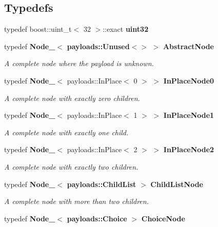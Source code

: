\subsection*{Typedefs}
\begin{CompactItemize}
\item 
typedef boost::uint\_\-t$<$ 32 $>$::exact {\bf uint32}\label{namespacesprite_a11}

\item 
typedef {\bf Node\_\-}$<$ {\bf payloads::Unused}$<$$>$ $>$ {\bf Abstract\-Node}\label{namespacesprite_a26}

\begin{CompactList}\small\item\em A complete node where the payload is unknown. \item\end{CompactList}\item 
typedef {\bf Node\_\-}$<$ payloads::In\-Place$<$ 0 $>$ $>$ {\bf In\-Place\-Node0}\label{namespacesprite_a27}

\begin{CompactList}\small\item\em A complete node with exactly zero children. \item\end{CompactList}\item 
typedef {\bf Node\_\-}$<$ payloads::In\-Place$<$ 1 $>$ $>$ {\bf In\-Place\-Node1}\label{namespacesprite_a28}

\begin{CompactList}\small\item\em A complete node with exactly one child. \item\end{CompactList}\item 
typedef {\bf Node\_\-}$<$ payloads::In\-Place$<$ 2 $>$ $>$ {\bf In\-Place\-Node2}\label{namespacesprite_a29}

\begin{CompactList}\small\item\em A complete node with exactly two children. \item\end{CompactList}\item 
typedef {\bf Node\_\-}$<$ {\bf payloads::Child\-List} $>$ {\bf Child\-List\-Node}\label{namespacesprite_a30}

\begin{CompactList}\small\item\em A complete node with more than two children. \item\end{CompactList}\item 
typedef {\bf Node\_\-}$<$ {\bf payloads::Choice} $>$ {\bf Choice\-Node}\label{namespacesprite_a31}


\end{CompactItemize}
